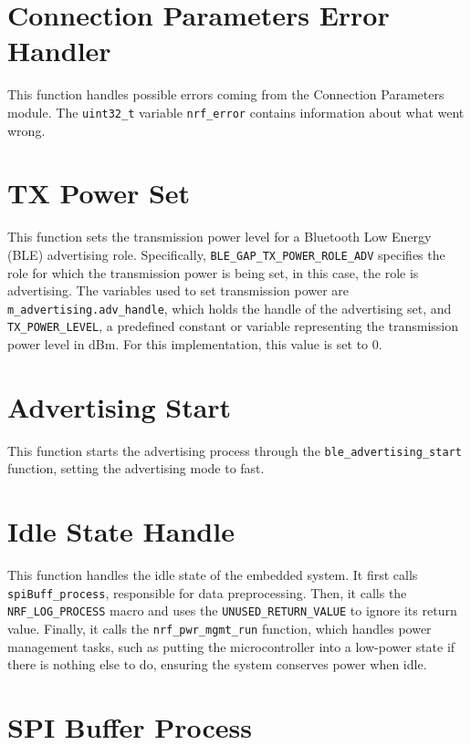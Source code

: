 \documentclass{Configuration_Files/PoliMi3i_thesis}
\begin{document}
\section*{Connection Parameters Error Handler}

This function handles possible errors coming from the Connection Parameters module. The \texttt{uint32\_t} variable \texttt{nrf\_error} contains information about what went wrong.

\section*{TX Power Set}

This function sets the transmission power level for a Bluetooth Low Energy (BLE) advertising role. Specifically, \texttt{BLE\_GAP\_TX\_POWER\_ROLE\_ADV} specifies the role for which the transmission power is being set, in this case, the role is advertising. The variables used to set transmission power are \texttt{m\_advertising.adv\_handle}, which holds the handle of the advertising set, and \texttt{TX\_POWER\_LEVEL}, a predefined constant or variable representing the transmission power level in dBm. For this implementation, this value is set to 0.

\section*{Advertising Start}

This function starts the advertising process through the \texttt{ble\_advertising\_start} function, setting the advertising mode to fast.

\section*{Idle State Handle}

This function handles the idle state of the embedded system. It first calls \texttt{spiBuff\_process}, responsible for data preprocessing. Then, it calls the \texttt{NRF\_LOG\_PROCESS} macro and uses the \texttt{UNUSED\_RETURN\_VALUE} to ignore its return value. Finally, it calls the \texttt{nrf\_pwr\_mgmt\_run} function, which handles power management tasks, such as putting the microcontroller into a low-power state if there is nothing else to do, ensuring the system conserves power when idle.

\section*{SPI Buffer Process}
\end{document}
